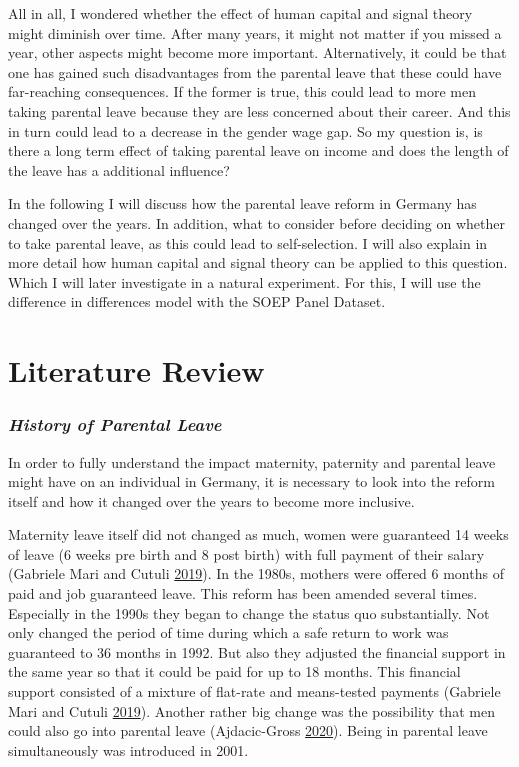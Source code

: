 \documentclass[
  12pt,
]{article}
\begin{document}
All in all, I wondered whether the effect of human capital and signal theory might diminish over time. After many years, it might not matter if you missed a year, other aspects might become more important. Alternatively, it could be that one has gained such disadvantages from the parental leave that these could have far-reaching consequences. If the former is true, this could lead to more men taking parental leave because they are less concerned about their career. And this in turn could lead to a decrease in the gender wage gap.
So my question is, is there a long term effect of taking parental leave on income and does the length of the leave has a additional influence?

In the following I will discuss how the parental leave reform in Germany has changed over the years. In addition, what to consider before deciding on whether to take parental leave, as this could lead to self-selection. I will also explain in more detail how human capital and signal theory can be applied to this question. Which I will later investigate in a natural experiment. For this, I will use the difference in differences model with the SOEP Panel Dataset.

\hypertarget{literature-review}{%
\section{Literature Review}\label{literature-review}}

\hypertarget{history-of-parental-leave}{%
\subsubsection*{\texorpdfstring{\emph{History of Parental Leave}}{History of Parental Leave}}\label{history-of-parental-leave}}

In order to fully understand the impact maternity, paternity and parental leave might have on an individual in Germany, it is necessary to look into the reform itself and how it changed over the years to become more inclusive.

Maternity leave itself did not changed as much, women were guaranteed 14 weeks of leave (6 weeks pre birth and 8 post birth) with full payment of their salary (Gabriele Mari and Cutuli \protect\hyperlink{ref-gabriele_mari_parental_2019}{2019}). In the 1980s, mothers were offered 6 months of paid and job guaranteed leave. This reform has been amended several times. Especially in the 1990s they began to change the status quo substantially. Not only changed the period of time during which a safe return to work was guaranteed to 36 months in 1992. But also they adjusted the financial support in the same year so that it could be paid for up to 18 months. This financial support consisted of a mixture of flat-rate and means-tested payments (Gabriele Mari and Cutuli \protect\hyperlink{ref-gabriele_mari_parental_2019}{2019}). Another rather big change was the possibility that men could also go into parental leave (Ajdacic-Gross \protect\hyperlink{ref-ajdacic-gross_elterngeld_2020}{2020}). Being in parental leave simultaneously was introduced in 2001.
\end{document}
